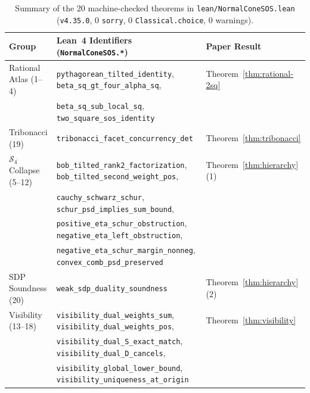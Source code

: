 \documentclass[11pt,a4paper]{article}
\newcommand{\calS}{\mathcal{S}}
\begin{document}
\begin{table}[t]
\centering
\caption{Summary of the 20 machine-checked theorems in \texttt{lean/NormalConeSOS.lean} (\texttt{v4.35.0}, 0 \texttt{sorry}, 0 \texttt{Classical.choice}, 0 warnings).}
\label{tab:lean}
\scriptsize
\setlength{\tabcolsep}{4pt}
\begin{tabular}{@{}lll@{}}
\toprule
Group & Lean~4 Identifiers (\texttt{NormalConeSOS.*}) & Paper Result \\
\midrule
Rational Atlas (1--4) & \texttt{pythagorean\_tilted\_identity}, \texttt{beta\_sq\_gt\_four\_alpha\_sq}, & Theorem~\ref{thm:rational-2sq} \\
& \texttt{beta\_sq\_sub\_local\_sq}, \texttt{two\_square\_sos\_identity} & \\
\addlinespace[2pt]
Tribonacci (19) & \texttt{tribonacci\_facet\_concurrency\_det} & Theorem~\ref{thm:tribonacci} \\
\addlinespace[2pt]
$\calS_4$ Collapse (5--12) & \texttt{bob\_tilted\_rank2\_factorization}, \texttt{bob\_tilted\_second\_weight\_pos}, & Theorem~\ref{thm:hierarchy}(1) \\
& \texttt{cauchy\_schwarz\_schur}, \texttt{schur\_psd\_implies\_sum\_bound}, & \\
& \texttt{positive\_eta\_schur\_obstruction}, \texttt{negative\_eta\_left\_obstruction}, & \\
& \texttt{negative\_eta\_schur\_margin\_nonneg}, \texttt{convex\_comb\_psd\_preserved} & \\
\addlinespace[2pt]
SDP Soundness (20) & \texttt{weak\_sdp\_duality\_soundness} & Theorem~\ref{thm:hierarchy}(2) \\
\addlinespace[2pt]
Visibility (13--18) & \texttt{visibility\_dual\_weights\_sum}, \texttt{visibility\_dual\_weights\_pos}, & Theorem~\ref{thm:visibility} \\
& \texttt{visibility\_dual\_S\_exact\_match}, \texttt{visibility\_dual\_D\_cancels}, & \\
& \texttt{visibility\_global\_lower\_bound}, \texttt{visibility\_uniqueness\_at\_origin} & \\
\bottomrule
\end{tabular}
\end{table}
\end{document}
